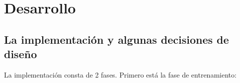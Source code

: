 \section{Desarrollo}
\subsection{La implementación y algunas decisiones de diseño}
La implementación consta de 2 fases. Primero está la fase de entrenamiento:
